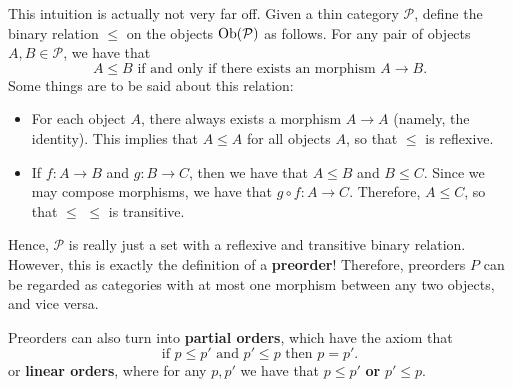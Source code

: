     This intuition is actually not very far off. Given a thin category $\mathcal{P}$,
    define the binary relation $\le$ on the objects $\operatorname{\mathrm{Ob}}(\mathcal{P})$ as follows. 
    For any pair of objects $A, B \in \mathcal{P}$, we have that 
    \[
        A \le B \text{ if and only if there exists an morphism } A \to B. 
    \]
    Some things are to be said about this relation:
    \begin{itemize}
        \item For each object $A$, 
        there always
        exists a morphism $A \to A$ (namely, the identity). This implies
        that $A \le A$ for all objects $A$, so that $\le$ is reflexive.

        \item If $f: A \to B$ and $g: B \to C$, then we have that 
        $A \le B$ and $B \le C$. Since we may compose morphisms, we 
        have that $g \circ f: A \to C$. Therefore, $A \le C$, so that $\le$ 
        $\le$ is transitive.
    \end{itemize}
    Hence, $\mathcal{P}$ is really just a set with a reflexive and transitive
    binary relation. However, this is exactly the definition of a \textbf{preorder}!
    Therefore, preorders $P$ can be regarded as categories with at most 
    one morphism between any two objects, and vice versa.

    Preorders can also turn into \textbf{partial orders}, which
    have the axiom that 
    \[
        \text{if } p \le p' \text{ and } p' \le p \text{ then } p = p'.
    \]
    or \textbf{linear orders}, where for any $p,  p'$ we have that $p \le
    p'$ \textbf{or} $p' \le p$.

